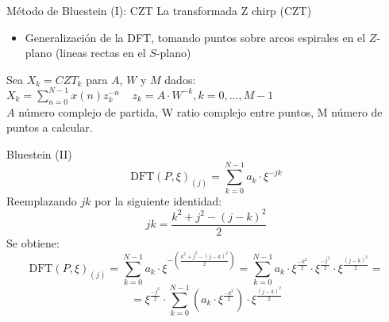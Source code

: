 \documentclass[spanish]{beamer}
\newcommand{\DFT}{\text{DFT}}
\begin{document}
\begin{frame}{Método de Bluestein (I): CZT}
La transformada Z chirp (CZT) 
\begin{itemize}
    \item Generalización de la DFT, tomando puntos sobre arcos espirales en el $Z$-plano (lineas rectas en el $S$-plano)
\end{itemize}
    \begin{definition}
    Sea $X_k = CZT_k$ para $A$, $W$ y $M$ dados:\\
    $X_k = \sum\limits_{n=0}^{N-1} x(n) z^{-n}_{k}\ \ \ \ \ z_k=A \cdot W^{-k}, k = 0,\dots, M-1$\\
    $A$ número complejo de partida, W ratio complejo entre puntos, M número de puntos a calcular.
    \end{definition}
\end{frame}

\begin{frame}{Bluestein (II)}
\begin{equation*}
\DFT(P,\xi)_{(j)}=\sum\limits_{k=0}^{N-1} a_k \cdot\xi^{-jk}
\end{equation*}
Reemplazando $jk$ por la siguiente identidad:
\begin{equation*}
    jk = \frac{k^2+j^2-(j-k)^2}{2}
\end{equation*}
Se obtiene:
\begin{equation*}
    \DFT(P,\xi)_{(j)}=\sum\limits_{k=0}^{N-1} a_k \cdot\xi^{-( \frac{k^2+j^2-(j-k)^2}{2})} = \sum\limits_{k=0}^{N-1} a_k \cdot\xi^{\frac{-k^2}{2}} \cdot\xi ^ {\frac{-j^2}{2}} \cdot\xi ^{\frac{(j-k)^2}{2}} =
\end{equation*}
\begin{equation*}
     = \boxed{\xi ^{\frac{-j^2}{2}} \cdot \sum\limits_{k=0}^{N-1} (a_k \cdot\xi ^ {\frac{-k^2}{2}}) \cdot \xi^{ \frac{(j-k)^2}{2}} }
\end{equation*}
\end{frame}
\end{document}
